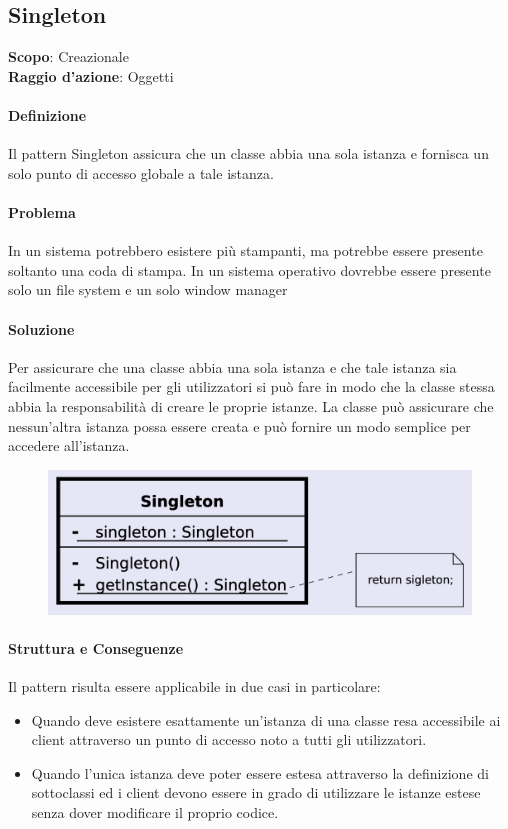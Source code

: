 \subsection{Singleton}
\label{singleton}

\textbf{Scopo}: Creazionale \\
\textbf{Raggio d'azione}: Oggetti

\paragraph{Definizione} Il pattern Singleton assicura che un classe abbia una sola istanza e fornisca un solo punto di accesso globale a tale istanza.

\paragraph{Problema} In un sistema potrebbero esistere più stampanti, ma potrebbe essere presente soltanto una coda di stampa. In un sistema operativo dovrebbe essere presente solo un file system e un solo window manager

\paragraph{Soluzione} Per assicurare che una classe abbia una sola istanza e che tale istanza sia facilmente accessibile per gli utilizzatori si può fare in modo che la classe stessa abbia la responsabilità di creare le proprie istanze. La classe può assicurare che nessun’altra istanza possa essere creata e può fornire un modo semplice per accedere all’istanza.

\begin{figure}[H]
    \centering
    \includegraphics[width=0.4\linewidth]{assets/pattern/singleton/singleton-struttura.png}
\end{figure}

\paragraph{Struttura e Conseguenze} Il pattern risulta essere applicabile in due casi in particolare:
\begin{itemize}
    \item Quando deve esistere esattamente un’istanza di una classe resa accessibile ai client attraverso un punto di accesso noto a tutti gli utilizzatori.
    \item Quando l’unica istanza deve poter essere estesa attraverso la definizione di sottoclassi ed i client devono essere in grado di utilizzare le istanze estese senza dover modificare il proprio codice.
\end{itemize}

